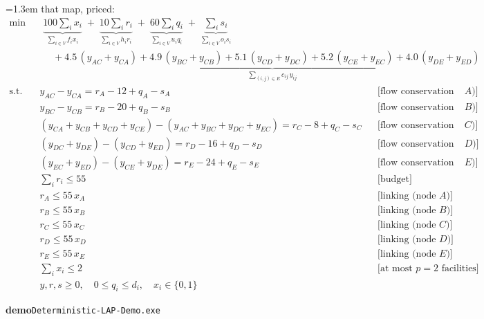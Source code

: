 \documentclass[10pt]{article}
\newenvironment{board}{%
  \par\vspace{2pt}
  \begingroup\leftskip=1.3em\relax}{%
  \par\endgroup\vspace{2pt}}
\begin{document}
\begin{board}
that map, priced:
\[
\begin{aligned}
  \min\quad & \underbrace{100 \textstyle\sum_i x_i}_{\sum_{i \in V} f_i x_i}
    \;+\; \underbrace{10 \textstyle\sum_i r_i}_{\sum_{i \in V} h_i r_i}
    \;+\; \underbrace{60 \textstyle\sum_i q_i}_{\sum_{i \in V} u_i q_i}
    \;+\; \underbrace{\textstyle\sum_i s_i}_{\sum_{i \in V} o_i s_i} \\[10pt]
  & \quad + \underbrace{4.5\,(y_{AC} + y_{CA}) + 4.9\,(y_{BC} + y_{CB}) + 5.1\,(y_{CD} + y_{DC})
    + 5.2\,(y_{CE} + y_{EC}) + 4.0\,(y_{DE} + y_{ED})}_{\sum_{(i,j) \in E} c_{ij}\, y_{ij}}
\end{aligned}
\]
\vspace{-2pt}
\[
\begin{aligned}
  \text{s.t.}\quad
    & y_{AC} - y_{CA} = r_A - 12 + q_A - s_A && \text{[flow conservation (node $A$)]} \\
    & y_{BC} - y_{CB} = r_B - 20 + q_B - s_B && \text{[flow conservation (node $B$)]} \\
    & \textstyle (y_{CA}{+}y_{CB}{+}y_{CD}{+}y_{CE}) - (y_{AC}{+}y_{BC}{+}y_{DC}{+}y_{EC}) = r_C - 8 + q_C - s_C && \text{[flow conservation (node $C$)]} \\
    & (y_{DC} + y_{DE}) - (y_{CD} + y_{ED}) = r_D - 16 + q_D - s_D && \text{[flow conservation (node $D$)]} \\
    & (y_{EC} + y_{ED}) - (y_{CE} + y_{DE}) = r_E - 24 + q_E - s_E && \text{[flow conservation (node $E$)]} \\
    & \textstyle\sum_i r_i \le 55 && \text{[budget]} \\
    & r_A \le 55\, x_A && \text{[linking (node $A$)]} \\
    & r_B \le 55\, x_B && \text{[linking (node $B$)]} \\
    & r_C \le 55\, x_C && \text{[linking (node $C$)]} \\
    & r_D \le 55\, x_D && \text{[linking (node $D$)]} \\
    & r_E \le 55\, x_E && \text{[linking (node $E$)]} \\
    & \textstyle\sum_i x_i \le 2 && \text{[at most $p = 2$ facilities]} \\
    & y, r, s \ge 0, \quad 0 \le q_i \le d_i, \quad x_i \in \{0,1\}
\end{aligned}
\]
\end{board}
\par{\leavevmode\color{demoink}\small\textbf{demo}\quad\texttt{Deterministic-LAP-Demo.exe}}\par
\end{document}
